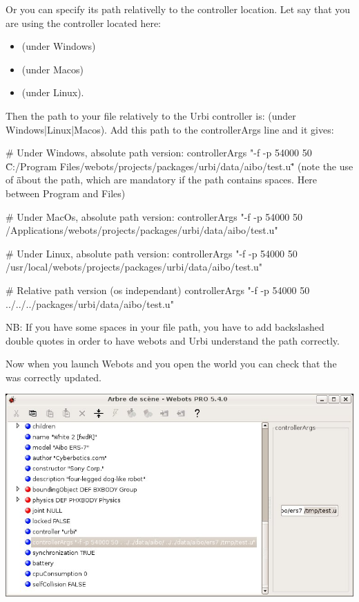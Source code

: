 Or you can specify its path relativelly to the \urbi controller
location.  Let say that you are using the \urbi controller located
here:
\begin{itemize}
\item {}
  (under Windows)
\item
  (under Macos)
\item {}
  (under Linux).
\end{itemize}

Then the path to your file relatively to the Urbi controller is:
 (under
Windows|Linux|Macos).  Add this path to the controllerArgs line and it
gives:

\begin{shell}
# Under Windows, absolute path version:
controllerArgs "-f -p 54000 50 \"C:/Program Files/webots/projects/packages/urbi/data/aibo/test.u\""
(note the use of \" \" about the path, which are mandatory if the path
contains spaces. Here between Program and Files)

# Under MacOs, absolute path version:
controllerArgs "-f -p 54000 50 /Applications/webots/projects/packages/urbi/data/aibo/test.u"

# Under Linux, absolute path version:
controllerArgs "-f -p 54000 50 /usr/local/webots/projects/packages/urbi/data/aibo/test.u"

# Relative path version (os independant)
controllerArgs "-f -p 54000 50 ../../../packages/urbi/data/aibo/test.u"
\end{shell}

NB: If you have some spaces in your file path, you have to add
backslashed double quotes in order to have webots and Urbi understand
the path correctly.

Now when you launch Webots and you open the world
 you can check that the
 was correctly updated.

\begin{center}
  \includegraphics[width=.8\linewidth]{img/webots/scene-tree-add-loaded-file}
\end{center}

